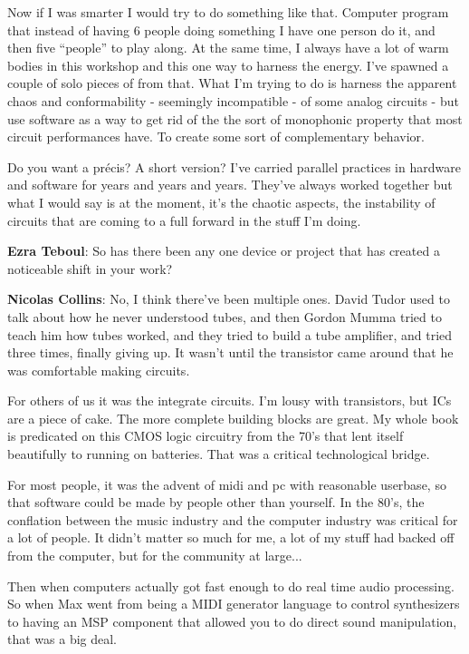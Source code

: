 Now if I was smarter I would try to do something like that. Computer program that instead of having 6 people doing something I have one person do it, and then five ``people'' to play along. At the same time, I always have a lot of warm bodies in this workshop and this one way to harness the energy. I’ve spawned a couple of solo pieces of from that. What I’m trying to do is harness the apparent chaos and conformability - seemingly incompatible - of some analog circuits - but use software as a way to get rid of the the sort of monophonic property that most circuit performances have. To create some sort of complementary behavior.
					
Do you want a précis? A short version? I’ve carried parallel practices in hardware and software for years and years and years. They’ve always worked together but what I would say is at the moment, it’s the chaotic aspects, the instability of circuits that are coming to a full forward in the stuff I’m doing.
					
\textbf{Ezra Teboul}: So has there been any one device or project that has created a noticeable shift in your work?
					
\textbf{Nicolas Collins}: No, I think there’ve been multiple ones. David Tudor used to talk about how he never understood tubes, and then Gordon Mumma tried to teach him how tubes worked, and they tried to build a tube amplifier, and tried three times, finally giving up. It wasn’t until the transistor came around that he was comfortable making circuits.
					
For others of us it was the integrate circuits. I’m lousy with transistors, but ICs are a piece of cake. The more complete building blocks are great. My whole book is predicated on this CMOS logic circuitry from the 70’s that lent itself beautifully to running on batteries. That was a critical technological bridge.
					
For most people, it was the advent of midi and pc with reasonable userbase, so that software could be made by people other than yourself. In the 80’s, the conflation between the music industry and the computer industry was critical for a lot of people. It didn’t matter so much for me, a lot of my stuff had backed off from the computer, but for the community at large...
					
Then when computers actually got fast enough to do real time audio processing. So when Max went from being a MIDI generator language to control synthesizers to having an MSP component that allowed you to do direct sound manipulation, that was a big deal.
					
